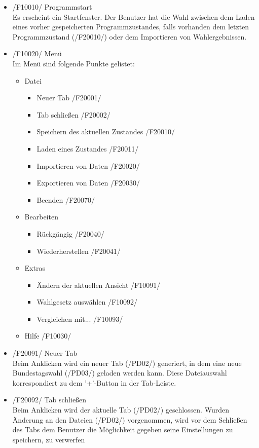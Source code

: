 \documentclass[10pt,a4paper]{article}
\begin{document}
\begin{itemize}
	\item /F10010/ Programmstart \hfill \\
	Es erscheint ein Startfenster. Der Benutzer hat die Wahl zwischen dem Laden eines vorher gespeicherten Programmzustandes, falls vorhanden dem letzten Programmzustand (/F20010/) oder dem Importieren von Wahlergebnissen.
	\item /F10020/ Menü \hfill \\
	Im Menü sind folgende Punkte gelistet:
	\begin{itemize}
		\item Datei
		\begin{itemize}
			\item Neuer Tab /F20001/
			\item Tab schließen /F20002/
			\item Speichern des aktuellen Zustandes /F20010/
			\item Laden eines Zustandes /F20011/
			\item Importieren von Daten /F20020/
			\item Exportieren von Daten /F20030/
			\item Beenden /F20070/
		\end{itemize}
		\item Bearbeiten
		\begin{itemize}
			\item Rückgängig /F20040/
			\item Wiederherstellen /F20041/
		\end{itemize}
		\item Extras
		\begin{itemize}
			\item Ändern der aktuellen Ansicht /F10091/
			\item Wahlgesetz auswählen /F10092/
			\item Vergleichen mit... /F10093/
		\end{itemize}
		\item Hilfe /F10030/
	\end{itemize}
	\item /F20091/ Neuer Tab \hfill \\
	Beim Anklicken wird ein neuer Tab (/PD02/) generiert, in dem eine neue Bundestagswahl (/PD03/) geladen werden kann. Diese Dateiauswahl korrespondiert zu dem '+'-Button in der Tab-Leiste.
	\item /F20092/ Tab schließen \hfill \\
	Beim Anklicken wird der aktuelle Tab (/PD02/) geschlossen. Wurden Änderung an den Dateien (/PD02/) vorgenommen, wird vor dem Schließen des Tabs dem Benutzer die Möglichkeit gegeben seine Einstellungen zu speichern, zu verwerfen 

\end{itemize}
\end{document}
